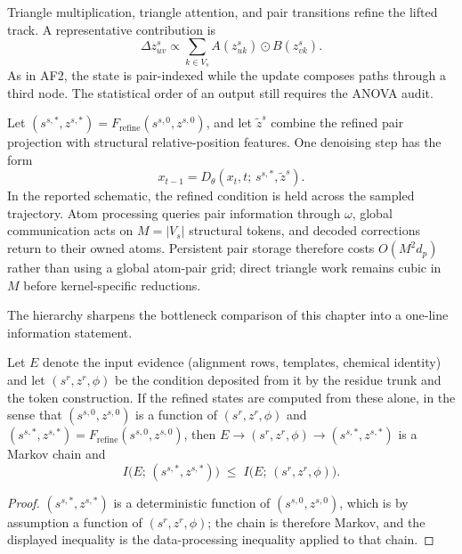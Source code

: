 Triangle multiplication, triangle attention, and pair transitions refine the lifted track.
A representative contribution is
\begin{equation}
\Delta z_{uv}^s\propto\sum_{k\in V_s}A(z_{uk}^s)\odot B(z_{vk}^s).
\label{eq:book-opendde-triangle-update}
\end{equation}
As in AF2, the state is pair-indexed while the update composes paths through a third node.
The statistical order of an output still requires the ANOVA audit.

Let $(s^{s,*},z^{s,*})=F_{\mathrm{refine}}(s^{s,0},z^{s,0})$, and let
$\widetilde z^s$ combine the refined pair projection with structural relative-position features.
One denoising step has the form
\begin{equation}
x_{t-1}=D_\theta(x_t,t;\,s^{s,*},\widetilde z^s).
\label{eq:book-opendde-conditioned-denoising}
\end{equation}
In the reported schematic, the refined condition is held across the sampled trajectory.
Atom processing queries pair information through $\omega$, global communication acts on
$M=|V_s|$ structural tokens, and decoded corrections return to their owned atoms.  Persistent
pair storage therefore costs $O(M^2d_p)$ rather than using a global atom-pair grid; direct triangle
work remains cubic in $M$ before kernel-specific reductions.

The hierarchy sharpens the bottleneck comparison of this chapter into a one-line information
statement.

\begin{proposition}
\label{prop:book-opendde-no-recovery}
Let $E$ denote the input evidence (alignment rows, templates, chemical identity) and let
$(s^r,z^r,\phi)$ be the condition deposited from it by the residue trunk and the token
construction.  If the refined states are computed from these alone, in the sense that
$(s^{s,0},z^{s,0})$ is a function of $(s^r,z^r,\phi)$ and
$(s^{s,*},z^{s,*})=F_{\mathrm{refine}}(s^{s,0},z^{s,0})$, then
$E\to(s^r,z^r,\phi)\to(s^{s,*},z^{s,*})$ is a Markov chain and
\begin{equation}
I\big(E;\,(s^{s,*},z^{s,*})\big)
\;\le\;
I\big(E;\,(s^r,z^r,\phi)\big).
\label{eq:book-opendde-dpi}
\end{equation}
\end{proposition}

\begin{proof}
$(s^{s,*},z^{s,*})$ is a deterministic function of $(s^{s,0},z^{s,0})$, which is by assumption a
function of $(s^r,z^r,\phi)$; the chain is therefore Markov, and the displayed inequality is the
data-processing inequality applied to that chain.
\end{proof}

